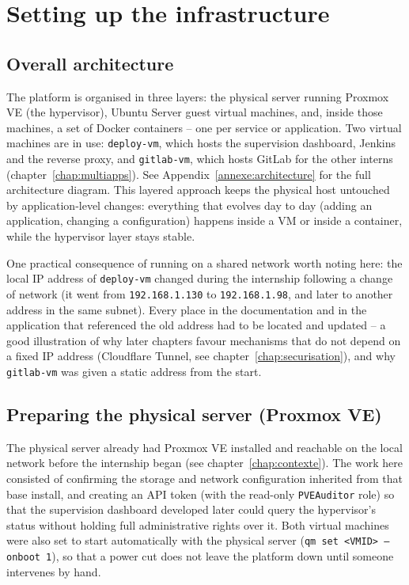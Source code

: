 \chapter{Setting up the infrastructure}
\label{chap:infra}

\section{Overall architecture}
The platform is organised in three layers: the physical server running Proxmox VE (the hypervisor), Ubuntu Server guest virtual machines, and, inside those machines, a set of Docker containers -- one per service or application. Two virtual machines are in use: \texttt{deploy-vm}, which hosts the supervision dashboard, Jenkins and the reverse proxy, and \texttt{gitlab-vm}, which hosts GitLab for the other interns (chapter~\ref{chap:multiapps}). See Appendix~\ref{annexe:architecture} for the full architecture diagram. This layered approach keeps the physical host untouched by application-level changes: everything that evolves day to day (adding an application, changing a configuration) happens inside a VM or inside a container, while the hypervisor layer stays stable.

One practical consequence of running on a shared network worth noting here: the local IP address of \texttt{deploy-vm} changed during the internship following a change of network (it went from \texttt{192.168.1.130} to \texttt{192.168.1.98}, and later to another address in the same subnet). Every place in the documentation and in the application that referenced the old address had to be located and updated -- a good illustration of why later chapters favour mechanisms that do not depend on a fixed IP address (Cloudflare Tunnel, see chapter~\ref{chap:securisation}), and why \texttt{gitlab-vm} was given a static address from the start.

\section{Preparing the physical server (Proxmox VE)}
The physical server already had Proxmox VE installed and reachable on the local network before the internship began (see chapter~\ref{chap:contexte}). The work here consisted of confirming the storage and network configuration inherited from that base install, and creating an API token (with the read-only \texttt{PVEAuditor} role) so that the supervision dashboard developed later could query the hypervisor's status without holding full administrative rights over it. Both virtual machines were also set to start automatically with the physical server (\texttt{qm set <VMID> --onboot 1}), so that a power cut does not leave the platform down until someone intervenes by hand.

